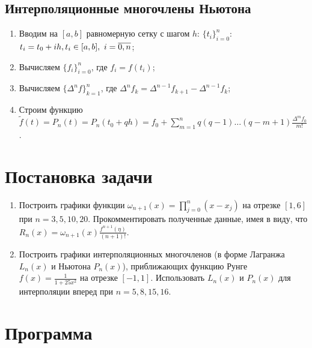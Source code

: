 \documentclass[
11pt,
master, %
subf, %
href, %
colorlinks=true, %
times, %
]{disser}
\begin{document}
\subsection{Интерполяционные многочлены Ньютона}
\begin{enumerate}
  \item Вводим на $[a,b]$ равномерную сетку с шагом $h$: $\{t_i\}_{i=0}^n$: $t_i = t_0 + ih,\\
  t_i\in[a,b], ~ i=\overline{0,n}$;
  \item Вычисляем $\{f_i\}_{i=0}^n$, где $f_i=f(t_i)$;
  \item Вычисляем $\{\Delta^n f\}_{k=1}^n$, где $\Delta^n f_k = \Delta^{n-1}f_{k+1} - \Delta^{n-1}f_k$;
  \item Строим функцию $\displaystyle\tilde{f}(t)=P_n(t)=P_n(t_0+qh) =f_0+\sum_{m=1}^{n}q(q-1)\ldots(q-m+1)\frac{\Delta^m f_0}{m!}$.

\end{enumerate}
\newpage
\section{Постановка задачи}
\begin{enumerate}
  \item Построить графики функции $\omega_{n+1}(x) = \prod_{j=0}^{n}(x-x_j)$ на отрезке $[1,6]$ при $n=3,5,10,20$. Прокомментировать полученные данные, имея в виду, что $R_n(x) = \omega_{n+1}(x)\frac{f^{n+1}(\eta)}{(n+1)!}$.
  \item Построить графики интерполяционных многочленов (в форме Лагранжа $L_n(x)$ и Ньютона $P_n(x)$), приближающих функцию Рунге $f(x)=\frac{1}{1+25x^2}$ на отрезке $[-1,1]$. Использовать $L_n(x)$ и $P_n(x)$ для интерполяции вперед при $n=5,8,15,16$.
\end{enumerate}

\newpage
\section{Программа}
\end{document}
